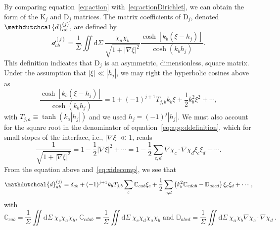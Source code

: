 \documentclass[a4paper]{jpconf}
\newcommand{\pow}[2]{#1^{(#2)}}
\newcommand{\dd}{\mathrm{d}}
\begin{document}
By comparing equation~\eqref{eq:action} with~\eqref{eq:actionDirichlet}, we can obtain the form of the $\bm{\mathrm{K}}_j$ and $\bm{\mathrm{D}}_j$ matrices. The matrix coefficients of $\bm{\mathrm{D}}_j$, denoted $\pow{\mathdutchcal{d}}{j}_{ab}$, are defined by
\begin{equation}
\label{eq:app:ddefinition}
    \pow{\mathcal{d}}{j}_{ab}=\frac{1}{\Sigma}\iint \dd\Sigma~ \frac{\chi_a\chi_b}{\sqrt{1+|\nabla\xi|^2}} \frac{\cosh[k_b(\xi-h_j)]}{\cosh(k_bh_j)}.
\end{equation}
This definition indicates that $\bm{\mathrm{D}}_j$ is an asymmetric, dimensionless, square matrix.
Under the assumption that $|\xi|\ll |h_j|$, we may right the hyperbolic cosines above as
\begin{equation}
    \frac{\cosh[k_b(\xi-h_j)]}{\cosh(k_bh_j)}= 1 + (-1)^{j+1}T_{j,b} k_b\xi +\frac{1}{2}k_b^2\xi^2 + \cdots,
\end{equation}
with $T_{j,a}\equiv \tanh(k_a|h_j|)$ and we used $h_j=(-1)^j |h_j|$. We must also account for the square root in the denominator of equation~\eqref{eq:app:ddefinition}, which for small slopes of the interface, i.e., $|\nabla\xi|\ll 1$, reads
\begin{equation}
    \frac{1}{\sqrt{1+|\nabla\xi|^2}}=1-\frac{1}{2}|\nabla\xi|^2+\cdots=1-\frac{1}{2}\sum_{c,d}\nabla\chi_c\cdot\nabla\chi_d \xi_c\xi_d+\cdots.
\end{equation}
From the equation above and~\eqref{eq:xidecomp}, we see that
\begin{equation}
\label{eq:app:dmatrix}
    \pow{\mathdutchcal{d}}{j}_{ab}=\delta_{ab}+(-1)^{j+1}k_bT_{j,b}\sum_c \mathbb{C}_{cab}\xi_c+\frac{1}{2}\sum_{c,d}\left(k_b^2\mathbb{C}_{cdab}-\mathbb{D}_{abcd}\right)\xi_c\xi_d+\cdots,
\end{equation}
with 
\begin{equation}
    \mathbb{C}_{cab} = \frac{1}{\Sigma}\iint \dd \Sigma~ \chi_c\chi_a\chi_b\text{, } \mathbb{C}_{cdab} = \frac{1}{\Sigma}\iint \dd \Sigma~ \chi_c\chi_d\chi_a\chi_b\text{ and }\mathbb{D}_{abcd} = \frac{1}{\Sigma}\iint \dd \Sigma~ \chi_a\chi_b\nabla\chi_c\cdot\nabla\chi_d~.
\end{equation}
\end{document}
